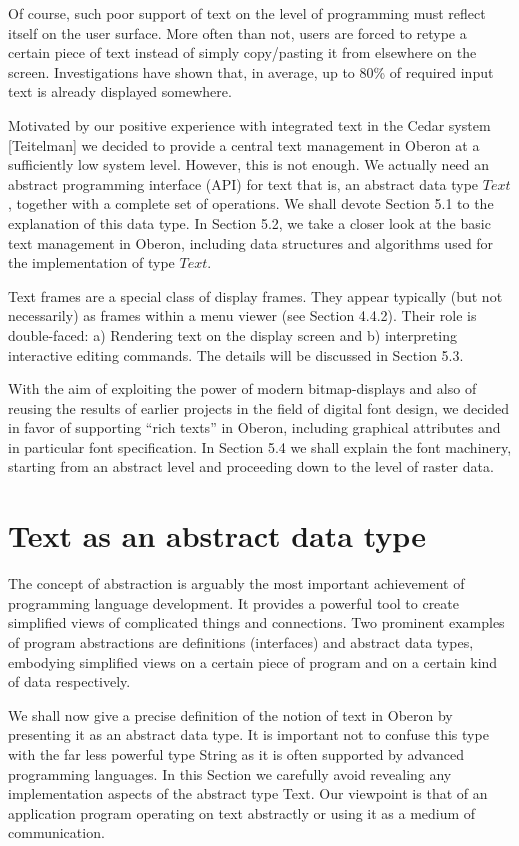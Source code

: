 Of course, such poor support of text on the level of programming must reflect itself on the user
surface. More often than not, users are forced to retype a certain piece of text instead of simply
copy/pasting it from elsewhere on the screen. Investigations have shown that, in average, up to
80\% of required input text is already displayed somewhere.

Motivated by our positive experience with integrated text in the Cedar system [Teitelman] we
decided to provide a central text management in Oberon at a sufficiently low system level.
However, this is not enough. We actually need an abstract programming interface (API) for text
that is, an abstract data type $Text$, together with a complete set of operations. We shall devote
Section 5.1 to the explanation of this data type. In Section 5.2, we take a closer look at the basic
text management in Oberon, including data structures and algorithms used for the implementation
of type $Text$.

Text frames are a special class of display frames. They appear typically (but not necessarily) as
frames within a menu viewer (see Section 4.4.2). Their role is double-faced: a) Rendering text on
the display screen and b) interpreting interactive editing commands. The details will be discussed
in Section 5.3.

With the aim of exploiting the power of modern bitmap-displays and also of reusing the results of
earlier projects in the field of digital font design, we decided in favor of supporting “rich texts” in
Oberon, including graphical attributes and in particular font specification. In Section 5.4 we shall
explain the font machinery, starting from an abstract level and proceeding down to the level of
raster data.

\section{Text as an abstract data type}
The concept of abstraction is arguably the most important achievement of programming language
development. It provides a powerful tool to create simplified views of complicated things and
connections. Two prominent examples of program abstractions are definitions (interfaces) and
abstract data types, embodying simplified views on a certain piece of program and on a certain kind
of data respectively.

We shall now give a precise definition of the notion of text in Oberon by presenting it as an abstract
data type. It is important not to confuse this type with the far less powerful type String as it is often
supported by advanced programming languages. In this Section we carefully avoid revealing any
implementation aspects of the abstract type Text. Our viewpoint is that of an application program
operating on text abstractly or using it as a medium of communication.

